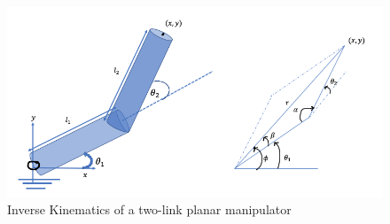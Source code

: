 \begin{figure}[tb!]
	\centering
	\includegraphics[width=.8\columnwidth]{figures/ik_ex.png}
	\caption{Inverse Kinematics of a two-link planar manipulator}
	\label{fig:ik_ex}
\end{figure}
